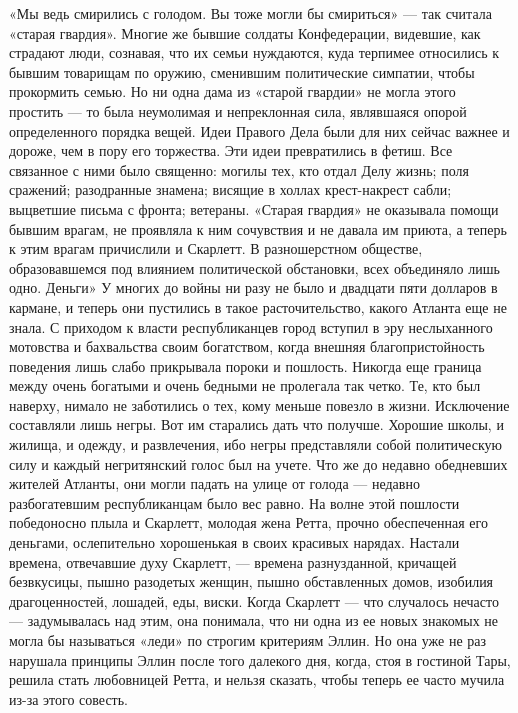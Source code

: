 «Мы ведь смирились с голодом. Вы тоже могли бы смириться» — так считала «старая гвардия». Многие же бывшие солдаты Конфедерации, видевшие, как страдают люди, сознавая, что их семьи нуждаются, куда терпимее относились к бывшим товарищам по оружию, сменившим политические симпатии, чтобы прокормить семью. Но ни одна дама из «старой гвардии» не могла этого простить — то была неумолимая и непреклонная сила, являвшаяся опорой определенного порядка вещей. Идеи Правого Дела были для них сейчас важнее и дороже, чем в пору его торжества. Эти идеи превратились в фетиш. Все связанное с ними было священно: могилы тех, кто отдал Делу жизнь; поля сражений; разодранные знамена; висящие в холлах крест-накрест сабли; выцветшие письма с фронта; ветераны. «Старая гвардия» не оказывала помощи бывшим врагам, не проявляла к ним сочувствия и не давала им приюта, а теперь к этим врагам причислили и Скарлетт.
В разношерстном обществе, образовавшемся под влиянием политической обстановки, всех объединяло лишь одно. Деньги» У многих до войны ни разу не было и двадцати пяти долларов в кармане, и теперь они пустились в такое расточительство, какого Атланта еще не знала.
С приходом к власти республиканцев город вступил в эру неслыханного мотовства и бахвальства своим богатством, когда внешняя благопристойность поведения лишь слабо прикрывала пороки и пошлость. Никогда еще граница между очень богатыми и очень бедными не пролегала так четко. Те, кто был наверху, нимало не заботились о тех, кому меньше повезло в жизни. Исключение составляли лишь негры. Вот им старались дать что получше. Хорошие школы, и жилища, и одежду, и развлечения, ибо негры представляли собой политическую силу и каждый негритянский голос был на учете. Что же до недавно обедневших жителей Атланты, они могли падать на улице от голода — недавно разбогатевшим республиканцам было вес равно.
На волне этой пошлости победоносно плыла и Скарлетт, молодая жена Ретта, прочно обеспеченная его деньгами, ослепительно хорошенькая в своих красивых нарядах. Настали времена, отвечавшие духу Скарлетт, — времена разнузданной, кричащей безвкусицы, пышно разодетых женщин, пышно обставленных домов, изобилия драгоценностей, лошадей, еды, виски. Когда Скарлетт — что случалось нечасто — задумывалась над этим, она понимала, что ни одна из ее новых знакомых не могла бы называться «леди» по строгим критериям Эллин. Но она уже не раз нарушала принципы Эллин после того далекого дня, когда, стоя в гостиной Тары, решила стать любовницей Ретта, и нельзя сказать, чтобы теперь ее часто мучила из-за этого совесть.
